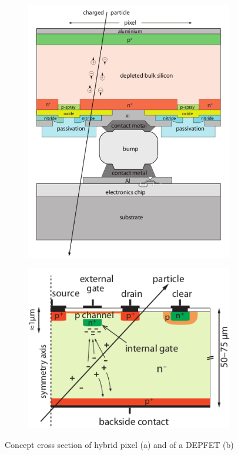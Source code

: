    \begin{figure}
      \begin{subfigure}{.5\textwidth}
      \centering
      \includegraphics[width=.6\linewidth]{figures/Pixel_detectors/hybrid_scheme.png}
      \end{subfigure}%
      \begin{subfigure}{.5\textwidth}
      \centering
      \includegraphics[width=.8\linewidth]{figures/Pixel_detectors/DEPFET_scheme.png}
      \end{subfigure}
      \caption{Concept cross section of hybrid pixel (a) and of a DEPFET (b)}
      \label{fig:hybrid_DEPFET_scheme}
   \end{figure} 

